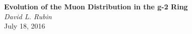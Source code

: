 \documentclass[10pt]{article}
\begin{document}
\begin{flushleft}
{\bf \Large Evolution of the Muon Distribution in the g-2 Ring}\\
\vskip 0.1in
{\it David L. Rubin}\\
\vskip 0.1in
July 18, 2016\\
\end{flushleft}

\end{document}
